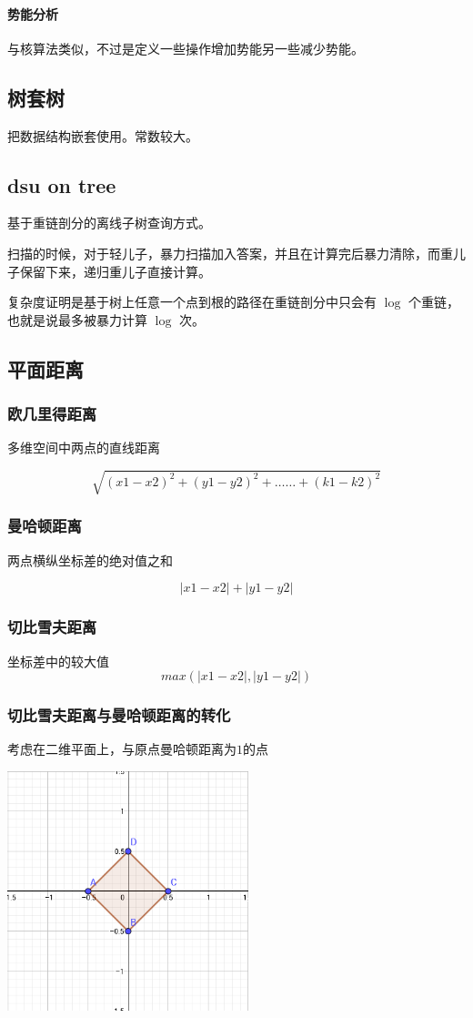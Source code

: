 \documentclass[UTF-8]{ctexart}
\begin{document}
		\paragraph{势能分析} 与核算法类似，不过是定义一些操作增加势能另一些减少势能。
		\subsection{树套树}
		把数据结构嵌套使用。常数较大。
		\subsection{dsu on tree}
		基于重链剖分的离线子树查询方式。
		
		扫描的时候，对于轻儿子，暴力扫描加入答案，并且在计算完后暴力清除，而重儿子保留下来，递归重儿子直接计算。
		
		复杂度证明是基于树上任意一个点到根的路径在重链剖分中只会有 $\log$ 个重链，也就是说最多被暴力计算 $\log$ 次。
		\subsection{平面距离}
			\subsubsection{欧几里得距离}
			多维空间中两点的直线距离  
			
			$$\sqrt{(x1-x2)^2+(y1-y2)^2+……+(k1-k2)^2}$$
			
			\subsubsection{曼哈顿距离}
			两点横纵坐标差的绝对值之和
			
			$$|x1-x2|+|y1-y2|$$
			
			\subsubsection{切比雪夫距离}
			坐标差中的较大值
			$$max(|x1-x2|,|y1-y2|)$$
			
			\subsubsection{切比雪夫距离与曼哈顿距离的转化}
			考虑在二维平面上，与原点曼哈顿距离为$1$的点
			
			\begin{center}
				\includegraphics[width=7cm]{file//manhattan.png}
			\end{center}
			
\end{document}
